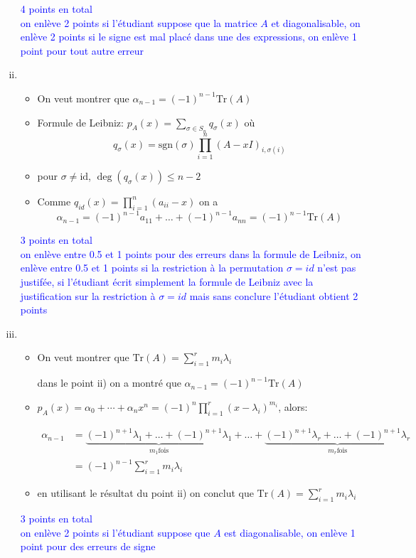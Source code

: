 \documentclass[11pt, a4paper, oneside]{article}
\newcommand{\indice}[1]{{\scriptsize \color{RubineRed} {#1}}}
\begin{document}
\begin{enumerate}[i)]
\begin{itemize}
\end{itemize}
\textcolor{blue}{4 points en total \\ on enlève 2 points si l'étudiant suppose que la matrice $A$ et diagonalisable, on enlève 2 points si le signe est mal placé dans une des expressions, on enlève 1 point pour tout autre erreur}

\item
  \begin{itemize}
    \item 
  On veut montrer que $\alpha_{n-1} = (-1)^{n-1}\text{Tr}(A)$ 
\item Formule de Leibniz: $ p_A(x) = \sum_{\sigma \in S_n} q_{\sigma}(x)$ où
  \begin{displaymath}
      q_{\sigma}(x) = \text{sgn}(\sigma)\prod_{i=1}^n(A-xI)_{i,\sigma(i)}
  \end{displaymath}
 
\item pour $σ ≠ \mathrm{id}$, $\deg(q_{\sigma}(x)) ≤ n-2$
\item  Comme $q_{id}(x) = \prod_{i=1}^n(a_{ii}-x)$ on a  $$\alpha_{n-1} = (-1)^{n-1}a_{11} + \ldots + (-1)^{n-1}a_{nn} = (-1)^{n-1}\text{Tr}(A)$$
\end{itemize} 
\textcolor{blue}{3 points en total \\ on enlève entre 0.5 et 1 points pour des erreurs dans la formule de Leibniz, on enlève entre 0.5 et 1 points si la restriction à la permutation $\sigma = id$ n'est pas justifée, si l'étudiant écrit simplement la formule de Leibniz avec la justification sur la restriction à $\sigma = id$ mais sans conclure l'étudiant obtient 2 points}

\item
  \begin{itemize}
  \item 
On veut montrer que $\text{Tr}(A) = \sum_{i=1}^r m_i\lambda_i$  

\indice {dans le point ii) on a montré que $\alpha_{n-1} = (-1)^{n-1}\text{Tr}(A)$}
\item $p_A(x) = α_0+ \cdots  + α_n x^n =   (-1)^n \prod_{i=1}^r (x-\lambda_i)^{m_i}$, alors: 

\begin{align*}
\alpha_{n-1} &= \underbrace{(-1)^{n+1}\lambda_1 + \ldots + (-1)^{n+1}\lambda_1}_{m_1 \text{fois}} + \ldots + \underbrace{(-1)^{n+1}\lambda_r + \ldots + (-1)^{n+1}\lambda_r}_{m_r \text{fois}} \\
&= (-1)^{n-1} \sum_{i=1}^r m_i\lambda_i
\end{align*}
\item
en utilisant le résultat du point ii) on conclut que $\text{Tr}(A) = \sum_{i=1}^r m_i\lambda_i$ \\ 
\end{itemize}
\textcolor{blue}{3 points en total \\ on enlève 2 points si l'étudiant suppose que $A$ est diagonalisable, on enlève 1 point pour des erreurs de signe} 
\end{enumerate}
\end{document}

